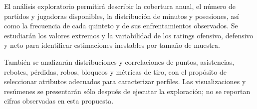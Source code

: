 El análisis exploratorio permitirá describir la cobertura anual, el número de partidos y jugadoras disponibles, la distribución de minutos y posesiones, así como la frecuencia de cada quinteto y de sus enfrentamientos observados. Se estudiarán los valores extremos y la variabilidad de los ratings ofensivo, defensivo y neto para identificar estimaciones inestables por tamaño de muestra.

También se analizarán distribuciones y correlaciones de puntos, asistencias, rebotes, pérdidas, robos, bloqueos y métricas de tiro, con el propósito de seleccionar atributos adecuados para caracterizar perfiles. Las visualizaciones y resúmenes se presentarán sólo después de ejecutar la exploración; no se reportan cifras observadas en esta propuesta.